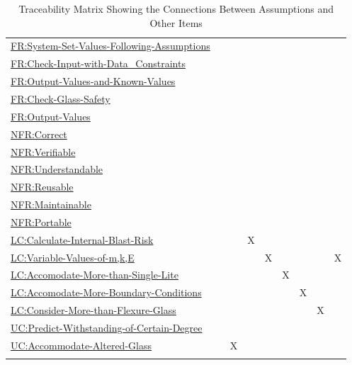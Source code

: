 \documentclass[12pt]{article}
\begin{document}
\begin{longtable}{l l l l l l l l l}
\\
\hyperref[sysSetValsFollowingAssumps]{FR:System-Set-Values-Following-Assumptions} &  &  &  &  &  &  &  & 
\\
\hyperref[checkInputWithDataCons]{FR:Check-Input-with-Data\_Constraints} &  &  &  &  &  &  &  & 
\\
\hyperref[outputValsAndKnownValues]{FR:Output-Values-and-Known-Values} &  &  &  &  &  &  &  & 
\\
\hyperref[checkGlassSafety]{FR:Check-Glass-Safety} &  &  &  &  &  &  &  & 
\\
\hyperref[outputValues]{FR:Output-Values} &  &  &  &  &  &  &  & 
\\
\hyperref[correct]{NFR:Correct} &  &  &  &  &  &  &  & 
\\
\hyperref[verifiable]{NFR:Verifiable} &  &  &  &  &  &  &  & 
\\
\hyperref[understandable]{NFR:Understandable} &  &  &  &  &  &  &  & 
\\
\hyperref[reusable]{NFR:Reusable} &  &  &  &  &  &  &  & 
\\
\hyperref[maintainable]{NFR:Maintainable} &  &  &  &  &  &  &  & 
\\
\hyperref[portable]{NFR:Portable} &  &  &  &  &  &  &  & 
\\
\hyperref[calcInternalBlastRisk]{LC:Calculate-Internal-Blast-Risk} &  &  & X &  &  &  &  & 
\\
\hyperref[varValsOfmkE]{LC:Variable-Values-of-m,k,E} &  &  &  & X &  &  &  & X
\\
\hyperref[accMoreThanSingleLite]{LC:Accomodate-More-than-Single-Lite} &  &  &  &  & X &  &  & 
\\
\hyperref[accMoreBoundaryConditions]{LC:Accomodate-More-Boundary-Conditions} &  &  &  &  &  & X &  & 
\\
\hyperref[considerMoreThanFlexGlass]{LC:Consider-More-than-Flexure-Glass} &  &  &  &  &  &  & X & 
\\
\hyperref[predictWithstandOfCertDeg]{UC:Predict-Withstanding-of-Certain-Degree} &  &  &  &  &  &  &  & 
\\
\hyperref[accAlteredGlass]{UC:Accommodate-Altered-Glass} &  & X &  &  &  &  &  & 
\\
\bottomrule
\caption{Traceability Matrix Showing the Connections Between Assumptions and Other Items}
\label{Table:TraceMatAvsAll}
\end{longtable}
\end{document}
